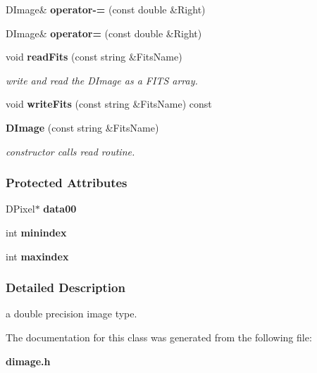 \begin{CompactItemize}
\item 
{}
DImage\& {\bf operator-=} (const double \&Right)\label{class_dimage_a25}

\item 
{}
DImage\& {\bf operator=} (const double \&Right)\label{class_dimage_a26}

\item 
{}
void {\bf read\-Fits} (const string \&Fits\-Name)\label{class_dimage_a27}

\begin{CompactList}\small\item\em write and read the DImage as a FITS array.\item\end{CompactList}\item 
{}
void {\bf write\-Fits} (const string \&Fits\-Name) const\label{class_dimage_a28}

\item 
{}
{\bf DImage} (const string \&Fits\-Name)\label{class_dimage_a29}

\begin{CompactList}\small\item\em constructor calls read routine.\item\end{CompactList}\end{CompactItemize}
\subsubsection*{Protected Attributes}
\begin{CompactItemize}
\item 
{}
DPixel$\ast$ {\bf data00}\label{class_dimage_n0}

\item 
{}
int {\bf minindex}\label{class_dimage_n1}

\item 
{}
int {\bf maxindex}\label{class_dimage_n2}

\end{CompactItemize}


\subsubsection{Detailed Description}
a double precision image type.



The documentation for this class was generated from the following file:\begin{CompactItemize}
\item 
{\bf dimage.h}\end{CompactItemize}
